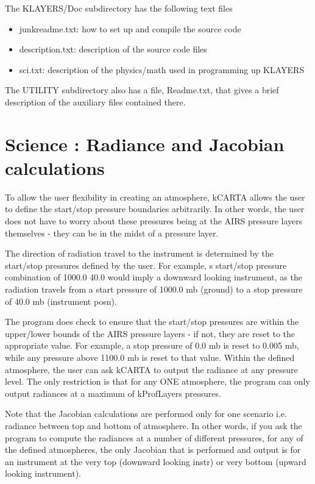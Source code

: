 \documentclass[12pt]{article}
\newcommand{\kc}{\textsf{kCARTA}\xspace}
\begin{document}
{{{{The KLAYERS/Doc subdirectory has the following text files
\begin{itemize}
\item {\sf junkreadme.txt}: how to set up and compile the source code 
\item {\sf description.txt}: description of the source code files
\item {\sf sci.txt}: description of the physics/math used in
programming up KLAYERS
\end{itemize}

The UTILITY subdirectory also has a file, {\sf Readme.txt}, that
gives a brief description of the auxiliary files contained there.

\section{Science : Radiance and Jacobian calculations}

To allow the user flexibility in creating an atmosphere, \kc allows
the user to define the start/stop pressure boundaries arbitrarily.  In
other words, the user does not have to worry about these pressures
being at the AIRS pressure layers themselves - they can be in the
midst of a pressure layer.

The direction of radiation travel to the instrument is determined by
the start/stop pressures defined by the user.  For example, s
start/stop pressure combination of 1000.0 40.0 would imply a downward
looking instrument, as the radiation travels from a start pressure of
1000.0 mb (ground) to a stop pressure of 40.0 mb (instrument posn).

The program does check to ensure that the start/stop pressures are
within the upper/lower bounds of the AIRS pressure layers - if not,
they are reset to the appropriate value.  For example, a stop pressure
of 0.0 mb is reset to 0.005 mb, while any pressure above 1100.0 mb is
reset to that value.  Within the defined atmosphere, the user can ask
\kc to output the radiance at any pressure level.  The only restriction
is that for any ONE atmosphere, the program can only output radiances
at a maximum of kProfLayers pressures.

Note that the Jacobian calculations are performed only for one
scenario i.e. radiance between top and bottom of atmosphere.  In other
words, if you ask the program to compute the radiances at a number of
different pressures, for any of the defined atmospheres, the only
Jacobian that is performed and output is for an instrument at the very
top (downward looking instr) or very bottom (upward looking
instrument).

}}}}
\end{document}
